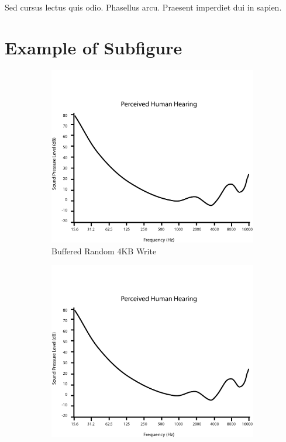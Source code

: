 \begin{savequote}[90mm]
  {\QuoteFont Sed cursus lectus quis odio. Phasellus arcu. Praesent
  imperdiet dui in sapien.}
\end{savequote}

\chapter{Example of Subfigure}
\label{chap:chapter_02}

\lipsum[1]

\begin{figure}[tp]
\centering
\begin{subfigure}[b]{0.48\textwidth}
\includegraphics[width=\textwidth]{./figures/figure2}
 \caption{Buffered Random 4KB Write}\label{fig:SAF:buf_4k_RW} 
\end{subfigure} \hfil
\begin{subfigure}[b]{0.48\textwidth}
  \includegraphics[width=\textwidth]{./figures/figure2}

\end{subfigure}
\end{figure}

